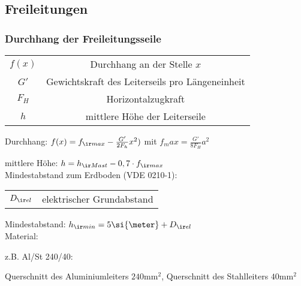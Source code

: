 \documentclass[german]{latex4ei/latex4ei_sheet}
\begin{document}
\begin{sectionbox}
\subsection{Freileitungen}
\subsubsection{Durchhang der Freileitungsseile}

\begin{symbolbox}
\begin{tabular}{cc}
 $f(x)$ & Durchhang an der Stelle $x$ \\
$G'$ & Gewichtskraft des Leiterseils pro Längeneinheit \\
$F_H$ & Horizontalzugkraft \\
$h$ & mittlere Höhe der Leiterseile
\end{tabular}
\end{symbolbox}

Durchhang: $f(x) = f_{\ir max} - \frac{G'}{2 F_h} x^2)$ mit $f_max = \frac{G'}{8 F_H} a^2$

mittlere Höhe: $h = h_{\ir Mast}  - 0,7 \cdot f_{\ir max}$ \\

Mindestabstand zum Erdboden (VDE 0210-1):

\begin{symbolbox}
\begin{tabular}{cc}
$D_{\ir el}$ & elektrischer Grundabstand
\end{tabular}
\end{symbolbox}

Mindestabstand: $h_{\ir min} = 5 \si{\meter} + D_{\ir el}$ \\

Material:

z.B. Al/St 240/40:

Querschnitt des Aluminiumleiters $240 \si{\milli \meter \squared}$, Querschnitt des Stahlleiters $40 \si{\milli \meter \squared} $
\end{sectionbox}
\end{document}
